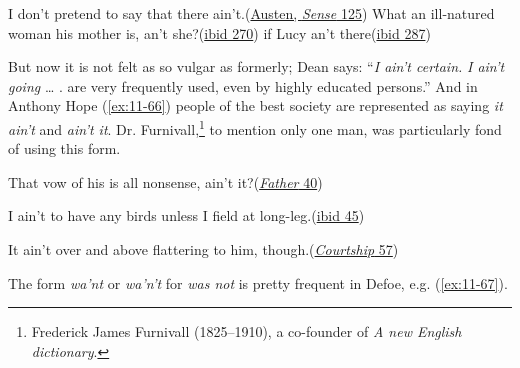 \ea \label{ex:11-63}
\ea
I don't pretend to say that there ain't.\hfill(\href{https://books.google.co.jp/books?id=W1kVAAAAYAAJ&pg=PA102&lpg=PA102&dq=%22sense+and+sensibility%22+%22pretend+to+say+that+there+ain%27t%22&source=bl&ots=5SCX-yP9KA&sig=ACfU3U3mnKs2V0Gx-o1aaxDRIx5FTrn7Gw&hl=en&sa=X&ved=2ahUKEwiZ6LnBzsCGAxU0qFYBHQ6aAPUQ6AF6BAgJEAM#v=onepage&q=%22sense%20and%20sensibility%22%20%22pretend%20to%20say%20that%20there%20ain't%22&f=false}{Austen, \textit{Sense} 125}) %
\ex
What an ill-natured woman his mother is, an't she?\hfill(\href{https://archive.org/details/sensesensibility00austrich/page/242/mode/2up?q=%22what+an+ill-natured%22&view=theater}{ibid 270}) 
\ex
if Lucy an't there\hfill(\href{https://archive.org/details/sensesensibility00austrich/page/258/mode/2up?q=%22Lucy+an%27t+there%22&view=theater}{ibid 287})
\z
\z

But now it is not felt as so vulgar as formerly; Dean \citet[\href{https://archive.org/details/queensenglishstr00alfo/page/70/mode/2up?q=\%22highly\%20educated\%20persons\%22&view=theater}{71}]{alford1888queens} says: ``\textit{I ain't certain.} %
\textit{I ain't going} {\dots} . are %
very frequently used, even by highly educated persons.'' And in Anthony Hope (\ref{ex:11-66}) people of the best society are represented as saying \textit{it ain't} and \textit{ain't it}. Dr. Furnivall,\footnote{Frederick James Furnivall (1825--1910), a co-founder of \textit{A new English dictionary}. \eds} to mention only one man, was particularly fond of using this form. 

\ea \label{ex:11-66}
\ea
That vow of his is all nonsense, ain't it?\hfill(\href{https://archive.org/details/fatherstafford00hope/page/72/mode/2up?q=%22ain%27t%22&view=theater}{\textit{Father} 40})

\ex
I ain't to have any birds unless I field at long-leg.\hfill(\href{https://archive.org/details/fatherstafford00hope/page/82/mode/2up?q=%22ain%27t%22&view=theater}{ibid 45})

\ex
It ain't over and above flattering to him, though.\hfill(\href{https://archive.org/details/comediesofcourts00hopeuoft/page/62/mode/2up?q=ain%27t&view=theater}{\textit{Courtship} 57}) 
\z \z
{}


The form \textit{wa'nt} or \textit{wa'n't} for \textit{was not} is pretty frequent in Defoe, e.g. (\ref{ex:11-67}).

